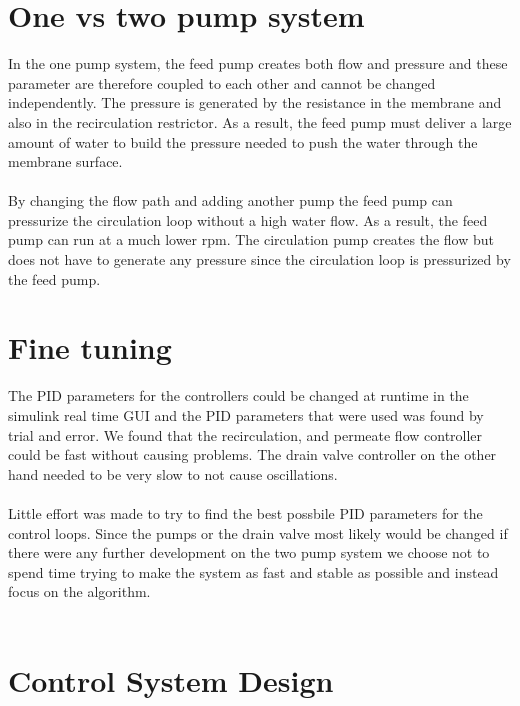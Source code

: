 \section{One vs two pump system}

In the one pump system, the feed pump creates both flow and pressure and these parameter are therefore coupled to each other and cannot be changed independently. The pressure is generated by the resistance in the membrane and also in the recirculation restrictor. As a result, the feed pump must deliver a large amount of water to build the pressure needed to push the water through the membrane surface. \\
\\
By changing the flow path and adding another pump the feed pump can pressurize the circulation loop without a high water flow. As a result, the feed pump can run at a much lower rpm. The circulation pump creates the flow but does not have to generate any pressure since the circulation loop is pressurized by the feed pump.

\section{Fine tuning}

The PID parameters for the controllers could be changed at runtime in the simulink real time GUI and the PID parameters that were used was found by trial and error. We found that the recirculation, and permeate flow controller could be fast without causing problems. The drain valve controller on the other hand needed to be very slow to not cause oscillations. \\
\\
Little effort was made to try to find the best possbile PID parameters for the control loops. Since the pumps or the drain valve most likely would be changed if there were any further development on the two pump system we choose not to spend time trying to make the system as fast and stable as possible and instead focus on the algorithm. \\
\\
\section{Control System Design}

